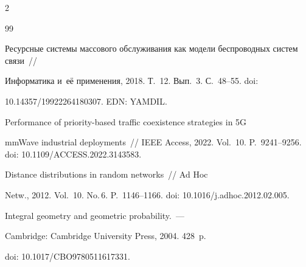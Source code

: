 \begin{multicols}{2}
{{\begin{thebibliography}{99}


Ресурсные системы массового обслуживания как модели беспроводных сис\-тем связи~// 


Информатика и~её применения, 2018. Т.~12. Вып.~3. С.~48--55. doi: 


10.14357/19922264180307. EDN: YAMDIL.







 Performance of priority-based traffic coexistence strategies in 5G 


mmWave industrial deployments~// IEEE Access, 2022.  Vol.~10. P.~9241--9256. doi: 10.1109/ACCESS.2022.3143583.







 Distance distributions in random networks~// Ad Hoc 


Netw., 2012. Vol.~10. No.\,6. P.~1146--1166. doi: 10.1016/j.adhoc.2012.02.005.







 Integral geometry and geometric probability.~--- 


Cambridge: Cambridge University Press, 2004. 428~p.


doi: 10.1017/CBO9780511617331.





\end{thebibliography}





 }


 }





\end{multicols}





\vspace*{-6pt}





